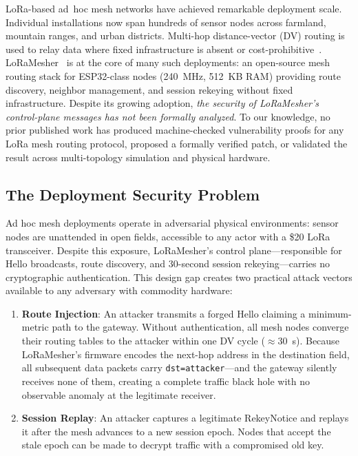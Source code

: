 \documentclass[preprint,12pt]{elsarticle}
\begin{document}
LoRa-based ad~hoc mesh networks have achieved remarkable
deployment scale.
Individual installations now span hundreds of sensor nodes across
farmland, mountain ranges, and urban districts.
Multi-hop distance-vector (DV) routing is used to relay data
where fixed infrastructure is absent or cost-prohibitive~\cite{ieee2025-lora-hierarchy-routing}.
LoRaMesher~\cite{sole2022-loramesher,sole2024-loramesher-dv,sole2026-loramesher-swx,repetto2022-lorawan-demo}
is at the core of many such deployments:
an open-source mesh routing stack for ESP32-class nodes
(240~MHz, 512~KB RAM) providing route discovery, neighbor
management, and session rekeying without fixed infrastructure.
Despite its growing adoption, \emph{the security of
LoRaMesher's control-plane messages has not been formally
analyzed}.
To our knowledge, no prior published work has produced
machine-checked vulnerability proofs for any LoRa mesh routing
protocol, proposed a formally verified patch, or validated the
result across multi-topology simulation and physical hardware.

\subsection{The Deployment Security Problem}

Ad hoc mesh deployments operate in adversarial physical environments:
sensor nodes are unattended in open fields, accessible to any
actor with a \$20 LoRa transceiver. Despite this exposure,
LoRaMesher's control plane—responsible for Hello broadcasts,
route discovery, and 30-second session rekeying—carries no
cryptographic authentication. This design gap creates two practical
attack vectors available to any adversary with commodity hardware:

\begin{enumerate}
  \item \textbf{Route Injection}: An attacker transmits a forged
    Hello claiming a minimum-metric path to the gateway.
    Without authentication, all mesh nodes converge their routing
    tables to the attacker within one DV cycle ($\approx$30~s).
    Because LoRaMesher's firmware encodes the next-hop address in
    the destination field, all subsequent data packets carry
    \texttt{dst=attacker}—and the gateway silently receives
    none of them, creating a complete traffic black hole with
    no observable anomaly at the legitimate receiver.

  \item \textbf{Session Replay}: An attacker captures a legitimate
    RekeyNotice and replays it after the mesh advances to a new
    session epoch. Nodes that accept the stale epoch can be made
    to decrypt traffic with a compromised old key.
\end{enumerate}
\end{document}
